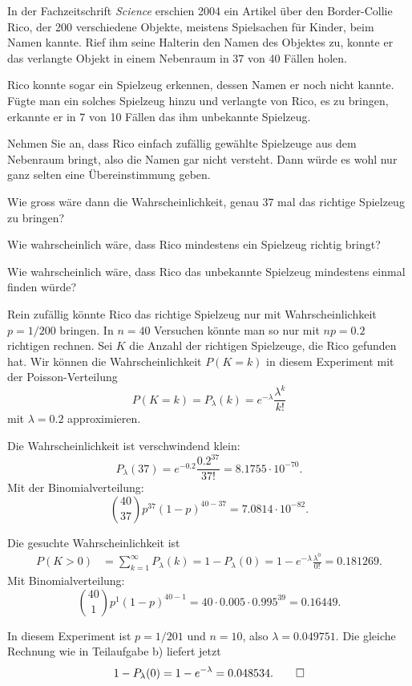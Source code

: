 In der Fachzeitschrift {\em Science} erschien 2004 ein Artikel über den
Border-Collie Rico, der 200 verschiedene Objekte, meistens Spielsachen
für Kinder, beim Namen kannte.
Rief ihm seine Halterin den Namen des Objektes zu, konnte er das verlangte
Objekt in einem Nebenraum in 37 von 40 Fällen holen.

Rico konnte sogar ein Spielzeug erkennen, dessen Namen er noch nicht
kannte.
Fügte man ein solches Spielzeug hinzu und verlangte von Rico, es zu bringen,
erkannte er in 7 von 10 Fällen das ihm unbekannte Spielzeug.

Nehmen Sie an, dass Rico einfach zufällig gewählte Spielzeuge aus
dem Nebenraum bringt, also die Namen gar nicht versteht.
Dann würde es wohl nur ganz selten eine Übereinstimmung geben.
\begin{teilaufgaben}
\item
Wie gross wäre dann die Wahrscheinlichkeit, genau 37 mal das richtige
Spielzeug zu bringen?
\item
Wie wahrscheinlich wäre, dass Rico mindestens ein Spielzeug richtig
bringt?
\item
Wie wahrscheinlich wäre, dass Rico das unbekannte Spielzeug mindestens
einmal finden würde?
\end{teilaufgaben}


\begin{loesung}
Rein zufällig könnte Rico das richtige Spielzeug nur mit Wahrscheinlichkeit
$p=1/200$ bringen.
In $n=40$ Versuchen könnte man so nur mit $np=0.2$ richtigen rechnen.
Sei $K$ die Anzahl der richtigen Spielzeuge, die Rico gefunden hat.
Wir können die Wahrscheinlichkeit $P(K=k)$ in diesem Experiment mit der
Poisson-Verteilung
\[
P(K=k)
=
P_\lambda(k)
=
e^{-\lambda}\frac{\lambda^k}{k!}
\]
mit $\lambda=0.2$ approximieren.
\begin{teilaufgaben}
\item
Die Wahrscheinlichkeit ist verschwindend klein:
\[
P_\lambda(37)
=
e^{-0.2}\frac{0.2^{37}}{37!}=8.1755\cdot10^{-70}.
\]
Mit der Binomialverteilung:
\[
\binom{40}{37}p^{37}(1-p)^{40-37}=7.0814\cdot10^{-82}.
\]
\item
Die gesuchte Wahrscheinlichkeit ist
\begin{align*}
P(K>0)
&=
\sum_{k=1}^\infty P_\lambda(k)
=
1-P_\lambda(0)
=
1-e^{-\lambda}\frac{\lambda^0}{0!}
=
0.181269.
\end{align*}
Mit Binomialverteilung:
\[
\binom{40}{1}p^1(1-p)^{40-1}=40\cdot0.005\cdot 0.995^39 = 0.16449.
\]
\item
In diesem Experiment ist $p=1/201$ und $n=10$, also $\lambda=0.049751$.
Die gleiche Rechnung wie in Teilaufgabe b) liefert jetzt
\[
1-P_\lambda(0)
=
1-e^{-\lambda}
=0.048534.
\qedhere
\]
\end{teilaufgaben}
\end{loesung}

